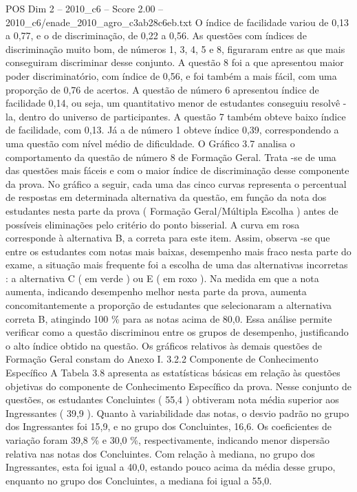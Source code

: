 \begin{textsample}{POS Dim 2 – 2010\_c6 – Score 2.00 – 2010\_c6/enade\_2010\_agro\_c3ab28c6eb.txt}
O índice de facilidade variou de 0,13 a 0,77, e o de discriminação, de 0,22 a 0,56.
As questões com índices de discriminação muito bom, de números 1, 3, 4, 5 e 8, figuraram entre as que mais conseguiram discriminar desse conjunto.
A questão 8 foi a que apresentou maior poder discriminatório, com índice de 0,56, e foi também a mais fácil, com uma proporção de 0,76 de acertos.
A questão de número 6 apresentou índice de facilidade 0,14, ou seja, um quantitativo menor de estudantes conseguiu resolvê -la, dentro do universo de participantes.
A questão 7 também obteve baixo índice de facilidade, com 0,13.
Já a de número 1 obteve índice 0,39, correspondendo a uma questão com nível médio de dificuldade.
O Gráfico 3.7 analisa o comportamento da questão de número 8 de Formação Geral.
Trata -se de uma das questões mais fáceis e com o maior índice de discriminação desse componente da prova.
No gráfico a seguir, cada uma das cinco curvas representa o percentual de respostas em determinada alternativa da questão, em função da nota dos estudantes nesta parte da prova ( Formação Geral/Múltipla Escolha ) antes de possíveis eliminações pelo critério do ponto bisserial.
A curva em rosa corresponde à alternativa B, a correta para este item.
Assim, observa -se que entre os estudantes com notas mais baixas, desempenho mais fraco nesta parte do exame, a situação mais frequente foi a escolha de uma das alternativas incorretas : a alternativa C ( em verde ) ou E ( em roxo ).
Na medida em que a nota aumenta, indicando desempenho melhor nesta parte da prova, aumenta concomitantemente a proporção de estudantes que selecionaram a alternativa correta B, atingindo 100 \% para as notas acima de 80,0.
Essa análise permite verificar como a questão discriminou entre os grupos de desempenho, justificando o alto índice obtido na questão.
Os gráficos relativos às demais questões de Formação Geral constam do Anexo I. 3.2.2 Componente de Conhecimento Específico A Tabela 3.8 apresenta as estatísticas básicas em relação às questões objetivas do componente de Conhecimento Específico da prova.
Nesse conjunto de questões, os estudantes Concluintes ( 55,4 ) obtiveram nota média superior aos Ingressantes ( 39,9 ).
Quanto à variabilidade das notas, o desvio padrão no grupo dos Ingressantes foi 15,9, e no grupo dos Concluintes, 16,6.
Os coeficientes de variação foram 39,8 \% e 30,0 \%, respectivamente, indicando menor dispersão relativa nas notas dos Concluintes.
Com relação à mediana, no grupo dos Ingressantes, esta foi igual a 40,0, estando pouco acima da média desse grupo, enquanto no grupo dos Concluintes, a mediana foi igual a 55,0.

\end{textsample}
